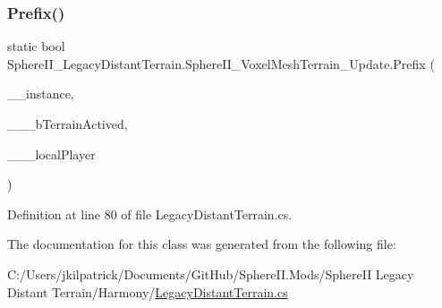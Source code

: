 \subsubsection{\texorpdfstring{Prefix()}{Prefix()}}
{\footnotesize\ttfamily static bool Sphere\+I\+I\+\_\+\+Legacy\+Distant\+Terrain.\+Sphere\+I\+I\+\_\+\+Voxel\+Mesh\+Terrain\+\_\+\+Update.\+Prefix (\begin{DoxyParamCaption}\item[{World\+Environment}]{\+\_\+\+\_\+instance,  }\item[{ref bool}]{\+\_\+\+\_\+\+\_\+b\+Terrain\+Actived,  }\item[{Entity\+Player}]{\+\_\+\+\_\+\+\_\+local\+Player }\end{DoxyParamCaption})\hspace{0.3cm}{\ttfamily [static]}}



Definition at line 80 of file Legacy\+Distant\+Terrain.\+cs.



The documentation for this class was generated from the following file\+:\begin{DoxyCompactItemize}
\item 
C\+:/\+Users/jkilpatrick/\+Documents/\+Git\+Hub/\+Sphere\+I\+I.\+Mods/\+Sphere\+I\+I Legacy Distant Terrain/\+Harmony/\mbox{\hyperlink{_legacy_distant_terrain_8cs}{Legacy\+Distant\+Terrain.\+cs}}\end{DoxyCompactItemize}
